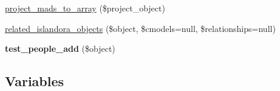 \begin{DoxyCompactItemize}
\item 
\hyperlink{islandora__bioinformatics__base_8module_a8a44fbb60fa898cede4db18005cd8602}{project\+\_\+mads\+\_\+to\+\_\+array} (\$project\+\_\+object)
\item 
\hyperlink{islandora__bioinformatics__base_8module_a1dc5e940beb7a2b30952ce00b01d388e}{related\+\_\+islandora\+\_\+objects} (\$object, \$cmodels=null, \$relationships=null)
\item 
\hypertarget{islandora__bioinformatics__base_8module_a99b5ea81575c95fda8879358c2ea0999}{{\bfseries test\+\_\+people\+\_\+add} (\$object)}\label{islandora__bioinformatics__base_8module_a99b5ea81575c95fda8879358c2ea0999}

\end{DoxyCompactItemize}
\subsection*{Variables}
